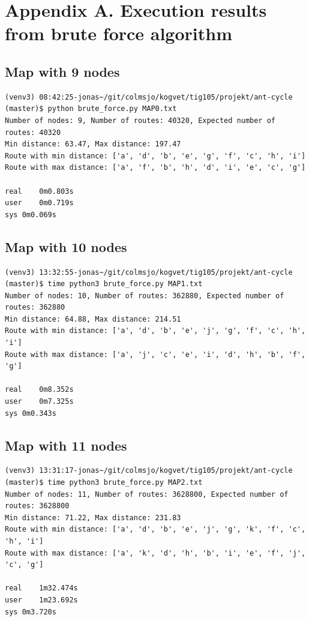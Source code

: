 \documentclass[11pt]{article}
\begin{document}



\clearpage

\appendix
\setcounter{secnumdepth}{0}

\section{Appendix A. Execution results from brute force algorithm}


\subsection{Map with 9 nodes}

\begin{lstlisting}
(venv3) 08:42:25-jonas~/git/colmsjo/kogvet/tig105/projekt/ant-cycle (master)$ python brute_force.py MAP0.txt
Number of nodes: 9, Number of routes: 40320, Expected number of routes: 40320
Min distance: 63.47, Max distance: 197.47
Route with min distance: ['a', 'd', 'b', 'e', 'g', 'f', 'c', 'h', 'i']
Route with max distance: ['a', 'f', 'b', 'h', 'd', 'i', 'e', 'c', 'g']

real	0m0.803s
user	0m0.719s
sys	0m0.069s
\end{lstlisting}


\subsection{Map with 10 nodes}

\begin{lstlisting}
(venv3) 13:32:55-jonas~/git/colmsjo/kogvet/tig105/projekt/ant-cycle (master)$ time python3 brute_force.py MAP1.txt
Number of nodes: 10, Number of routes: 362880, Expected number of routes: 362880
Min distance: 64.88, Max distance: 214.51
Route with min distance: ['a', 'd', 'b', 'e', 'j', 'g', 'f', 'c', 'h', 'i']
Route with max distance: ['a', 'j', 'c', 'e', 'i', 'd', 'h', 'b', 'f', 'g']

real	0m8.352s
user	0m7.325s
sys	0m0.343s
\end{lstlisting}


\subsection{Map with 11 nodes}

\begin{lstlisting}
(venv3) 13:31:17-jonas~/git/colmsjo/kogvet/tig105/projekt/ant-cycle (master)$ time python3 brute_force.py MAP2.txt
Number of nodes: 11, Number of routes: 3628800, Expected number of routes: 3628800
Min distance: 71.22, Max distance: 231.83
Route with min distance: ['a', 'd', 'b', 'e', 'j', 'g', 'k', 'f', 'c', 'h', 'i']
Route with max distance: ['a', 'k', 'd', 'h', 'b', 'i', 'e', 'f', 'j', 'c', 'g']

real	1m32.474s
user	1m23.692s
sys	0m3.720s
\end{lstlisting}
\end{document}
